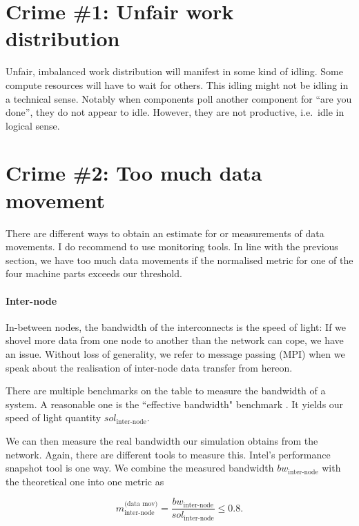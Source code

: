 \section{Crime \#1: Unfair work distribution}

Unfair, imbalanced work distribution will manifest in some kind of idling.
Some compute resources will have to wait for others.
This idling might not be idling in a technical sense.
Notably when components poll another component for ``are you done'', they do not
appear to idle. 
However, they are not productive, i.e.~idle in logical sense.




\section{Crime \#2: Too much data movement}

There are different ways to obtain an estimate for or measurements of data
movements.
I do recommend to use monitoring tools.
In line with the previous section, we have too much data movements if the
normalised metric for one of the four machine parts exceeds our threshold. 

\paragraph*{Inter-node}

In-between nodes, the bandwidth of the interconnects is the speed of light: If
we shovel more data from one node to another than the network can cope, we have
an issue.
Without loss of generality, we refer to message passing (MPI) when we speak
about the realisation of inter-node data transfer from hereon.


There are multiple benchmarks on the table to measure the bandwidth of
a system. 
A reasonable one is the ``effective bandwidth"
benchmark \cite{Rabenseifner:2024:EffectiveMPIBandwidth}.
It yields our speed of light quantity $sol_{\text{inter-node}}$.


We can then measure the real bandwidth our simulation obtains from the network. 
Again, there are different tools to measure this. 
Intel's performance snapshot tool is one way.
We combine the measured bandwidth $bw_{\text{inter-node}}$ with the theoretical
one into one metric as

\begin{equation}
m^{\text{(data mov)}}_{\text{inter-node}} = \frac{bw_{\text{inter-node}} }{
sol_{\text{inter-node}} } \leq 0.8.
  \label{equation:performance-assessment:mpi-bandwidth}
\end{equation}


